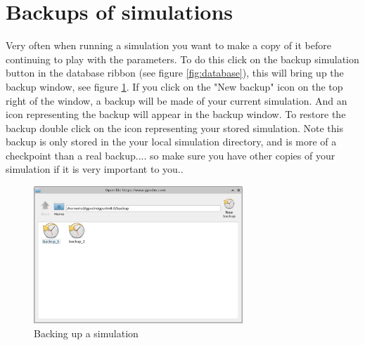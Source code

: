 \newpage
\section{Backups of simulations}
Very often when running a simulation you want to make a copy of it before continuing to play with the parameters.  To do this click on the backup simulation button in the database ribbon (see figure \ref{fig:database}), this will bring up the backup window, see figure \ref{fig:backup}. If you click on the "New backup" icon on the top right of the window, a backup will be made of your current simulation.  And an icon representing the backup will appear in the backup window.  To restore the backup double click on the icon representing your stored simulation. Note this backup is only stored in the your local simulation directory, and is more of a checkpoint than a real backup.... so make sure you have other copies of your simulation if it is very important to you..

\begin{figure}[H]
\centering
\includegraphics[width=0.7\textwidth]{./images/backup.png}
\caption{Backing up a simulation}
\label{fig:backup}
\end{figure}

